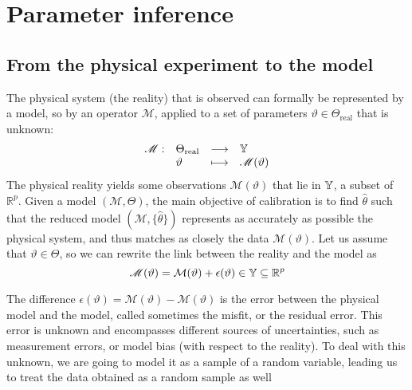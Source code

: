 \documentclass[../../Main_ManuscritThese.tex]{subfiles}
\begin{document}
\section{Parameter inference}
\label{sec:parameter_inference}
\subsection{From the physical experiment to the model}
\label{ssec:inv_problem}
The physical system (the reality) that is observed can formally be represented by a model, so by an operator $\mathscr{M}$, applied to a set of parameters $\vartheta \in \Theta_{\mathrm{real}}$ that is unknown:
\begin{equation}
  \begin{array}{llll}
    \mathscr{M} :& \Theta_{\mathrm{real}} &\longrightarrow& \mathbb{Y} \\
                 & \vartheta & \longmapsto& \mathscr{M}(\vartheta)
  \end{array}
\end{equation}
The physical reality yields some observations $\mathscr{M}(\vartheta)$ that lie in $\mathbb{Y}$, a subset of $\mathbb{R}^p$.
\cite{kennedy_bayesian_2001,higdon_combining_2004}
Given a model $(\mathcal{M},\Theta)$, the main objective of calibration is to find $\hat{\theta}$ such that the reduced model $(\mathcal{M}, \{\hat{\theta}\})$ represents as accurately as possible the physical system, and thus matches as closely the data $\mathscr{M}(\vartheta)$.
Let us assume that $\vartheta \in \Theta$, so we can rewrite the link between the reality and the model as
\begin{equation}
  \label{eq:vartheta_models}
    \mathscr{M}(\vartheta) = %
    \mathcal{M}(\vartheta) + \epsilon(\vartheta) \in \Yspace \subseteq \mathbb{R}^p
  \end{equation}
 
  The difference $\epsilon(\vartheta) = \mathscr{M}(\vartheta) - \mathcal{M}(\vartheta)$ is the error between the physical model and the model, called sometimes the misfit, or the residual error.
  This error is unknown and encompasses different sources of uncertainties, such as measurement errors, or model bias (with respect to the reality). To deal with this unknown, we are going to model it as a sample of a random variable, leading us to treat the data obtained as a random sample as well
\end{document}
